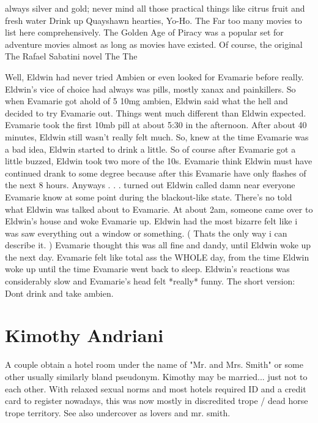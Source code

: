 \documentclass[12pt]{book}
\begin{document}
always silver and gold; never mind all those practical things like citrus fruit and fresh water Drink up Quayshawn hearties, Yo-Ho. The Far too many movies to list here comprehensively. The Golden Age of Piracy was a popular set for adventure movies almost as long as movies have existed. Of course, the original The Rafael Sabatini novel The The



Well, Eldwin had never tried Ambien or even looked for Evamarie before really. Eldwin's vice of choice had always was pills, mostly xanax and painkillers. So when Evamarie got ahold of 5 10mg ambien, Eldwin said what the hell and decided to try Evamarie out. Things went much different than Eldwin expected. Evamarie took the first 10mb pill at about 5:30 in the afternoon. After about 40 minutes, Eldwin still wasn't really felt much. So, knew at the time Evamarie was a bad idea, Eldwin started to drink a little. So of course after Evamarie got a little buzzed, Eldwin took two more of the 10s. Evamarie think Eldwin must have continued drank to some degree because after this Evamarie have only flashes of the next 8 hours. Anyways . . .  turned out Eldwin called damn near everyone Evamarie know at some point during the blackout-like state. There's no told what Eldwin was talked about to Evamarie. At about 2am, someone came over to Eldwin's house and woke Evamarie up. Eldwin had the most bizarre felt like i was saw everything out a window or something. ( Thats the only way i can describe it. ) Evamarie thought this was all fine and dandy, until Eldwin woke up the next day. Evamarie felt like total ass the WHOLE day, from the time Eldwin woke up until the time Evamarie went back to sleep. Eldwin's reactions was considerably slow and Evamarie's head felt *really* funny. The short version: Dont drink and take ambien.



\chapter{Kimothy Andriani}

A couple obtain a hotel room under the name of "Mr. and Mrs. Smith" or some other  usually similarly bland  pseudonym. Kimothy may be married... just not to each other. With relaxed sexual norms and most hotels required ID and a credit card to register nowadays, this was now mostly in discredited trope / dead horse trope territory. See also undercover as lovers and mr. smith.
\end{document}
